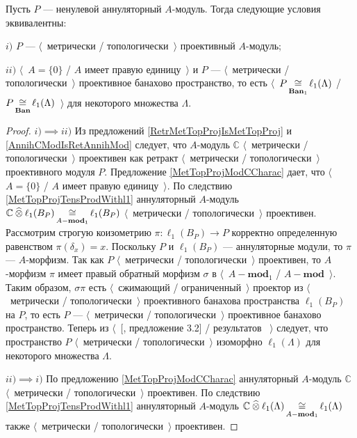 \begin{proposition}\label{MetTopProjOfAnnihModCharac} Пусть $P$ --- ненулевой аннуляторный $A$-модуль. Тогда следующие условия эквивалентны:

$i)$ $P$ --- $\langle$~метрически / топологически~$\rangle$ проективный $A$-модуль;

$ii)$ $\langle$~$A=\{0\}$ / $A$ имеет правую единицу~$\rangle$ и $P$ --- $\langle$~метрически / топологически~$\rangle$ проективное банахово пространство, то есть $\langle$~$P\mathop{\mathbin{\cong}}\limits_{\mathbf{Ban}_1}\ell_1(\Lambda)$ / $P\mathop{\mathbin{\cong}}\limits_{\mathbf{Ban}}\ell_1(\Lambda)$~$\rangle$ для некоторого множества $\Lambda$.
\end{proposition}
\begin{proof} $i)$$\implies$$ ii)$ Из предложений \ref{RetrMetTopProjIsMetTopProj} и \ref{AnnihCModIsRetAnnihMod} следует, что $A$-модуль $\mathbb{C}$ $\langle$~метрически / топологически~$\rangle$ проективен как ретракт $\langle$~метрически / топологически~$\rangle$ проективного модуля $P$. Предложение \ref{MetTopProjModCCharac} дает, что $\langle$~$A=\{0\}$ / $A$ имеет правую единицу~$\rangle$.  По следствию \ref{MetTopProjTensProdWithl1} аннуляторный $A$-модуль $\mathbb{C}\mathbin{\widehat{\otimes}}\ell_1(B_P)\mathop{\mathbin{\cong}}\limits_{A-\mathbf{mod}_1}\ell_1(B_P)$ $\langle$~метрически / топологически~$\rangle$ проективен. Рассмотрим строгую коизометрию $\pi:\ell_1(B_P)\to P$ корректно определенную равенством $\pi(\delta_x)=x$. Поскольку $P$ и $\ell_1(B_P)$ --- аннуляторные модули, то $\pi$ --- $A$-морфизм. Так как $P$ $\langle$~метрически / топологически~$\rangle$ проективен, то $A$-морфизм $\pi$ имеет правый обратный морфизм $\sigma$ в $\langle$~$A-\mathbf{mod}_1$ / $A-\mathbf{mod}$~$\rangle$. Таким образом, $\sigma\pi$ есть $\langle$~сжимающий / ограниченный~$\rangle$ проектор из $\langle$~метрически / топологически~$\rangle$ проективного банахова пространства $\ell_1(B_P)$ на $P$, то есть $P$ --- $\langle$~метрически / топологически~$\rangle$ проективное банахово пространство. Теперь из $\langle$~[\cite{HelMetrFrQMod}, предложение 3.2] / результатов \cite{KotheTopProjBanSp}~$\rangle$ следует, что пространство $P$ $\langle$~метрически / топологически~$\rangle$ изоморфно $\ell_1(\Lambda)$ для некоторого множества $\Lambda$. 

$ii)$$\implies$$ i)$ По предложению \ref{MetTopProjModCCharac} аннуляторный $A$-модуль $\mathbb{C}$ $\langle$~метрически / топологически~$\rangle$ проективен. По следствию \ref{MetTopProjTensProdWithl1} аннуляторный $A$-модуль $\mathbb{C}\mathbin{\widehat{\otimes}}\ell_1(\Lambda)\mathop{\mathbin{\cong}}\limits_{A-\mathbf{mod}_1}\ell_1(\Lambda)$ также $\langle$~метрически / топологически~$\rangle$ проективен.
\end{proof}

